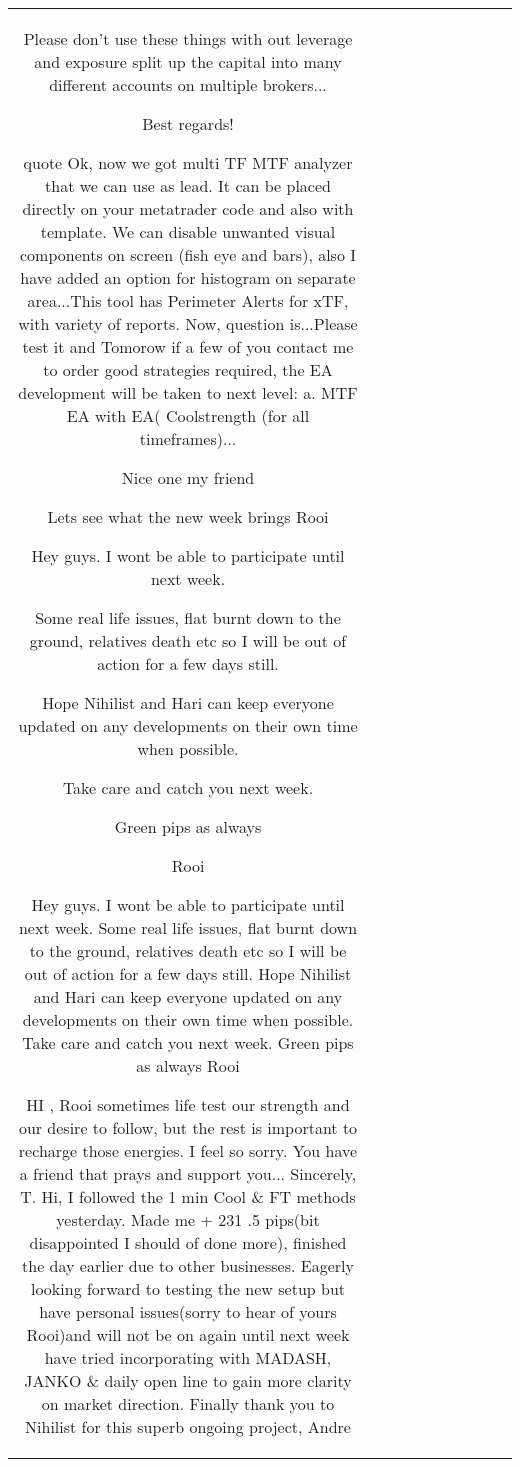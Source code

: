 \begin{table}[h!]
\begin{tabular}{|c|c|c|c|c|c|c|c|c|c|}
Please don't use these things with out leverage and exposure split up the capital into many different accounts on multiple brokers...

Best regards!

{quote} Ok, now we got multi TF MTF analyzer that we can use as lead. It can be placed directly on your metatrader code and also with template. We can disable unwanted visual components on screen (fish eye and bars), also I have added an option for histogram on separate area...This tool has Perimeter Alerts for xTF, with variety of reports. Now, question is...Please test it and Tomorow if a few of you contact me to order good strategies required, the EA development will be taken to next level: a. MTF EA with EA( Coolstrength (for all timeframes)...

Nice one my friend 

Lets see what the new week brings
Rooi


Hey guys. I wont be able to participate until next week.

Some real life issues, flat burnt down to the ground, relatives death etc so I will be out of action for a few days still.

Hope Nihilist and Hari can keep everyone updated on any developments on their own time when possible.

Take care and catch you next week.

Green pips as always

Rooi


Hey guys. I wont be able to participate until next week. Some real life issues, flat burnt down to the ground, relatives death etc so I will be out of action for a few days still. Hope Nihilist and Hari can keep everyone updated on any developments on their own time when possible. Take care and catch you next week. Green pips as always Rooi 

HI , Rooi sometimes life test our strength and our desire to follow, but the rest is important to recharge those energies.
I feel so sorry. You have a friend that prays and support you...
Sincerely,
T.
Hi, I followed the 1 min Cool \& FT methods yesterday. Made me + 231 .5 pips(bit disappointed I should of done more), finished the day earlier due to other businesses. Eagerly looking forward to testing the new setup but have personal issues(sorry to hear of yours Rooi)and will not be on again until next week
have tried incorporating with MADASH, JANKO \& daily open line to gain more clarity on market direction.
Finally thank you to Nihilist for this superb ongoing project,
Andre


\end{tabular}
\end{table}
